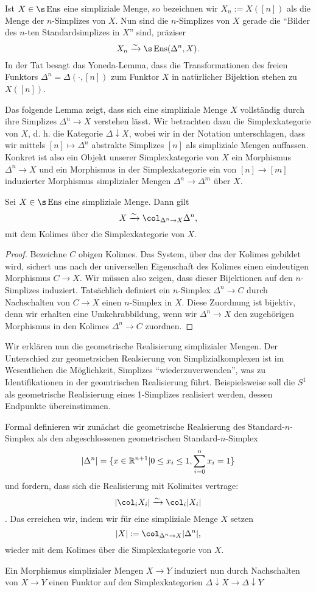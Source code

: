 Ist $X \in \s\Ens$ eine simpliziale Menge, so bezeichnen wir $X_n :=
X([n])$ als die Menge der $n$-Simplizes von $X$. Nun sind die
$n$-Simplizes von $X$ gerade die ``Bilder des $n$-ten
Standardsimplizes in $X$'' sind, präziser
\[ X_n \iso \s\Ens(\Delta^n, X). \]
In der Tat besagt das Yoneda-Lemma, dass die Transformationen des
freien Funktors $\Delta^n = \Delta(\cdot, [n])$ zum Funktor $X$ in
natürlicher Bijektion stehen zu $X([n])$.

Das folgende Lemma zeigt, dass sich eine simpliziale Menge $X$
vollständig durch ihre Simplizes $\Delta^n \to X$ verstehen lässt.
Wir betrachten dazu die Simplexkategorie von $X$, d. h. die Kategorie
$\Delta \downarrow X$, wobei wir in der Notation unterschlagen, dass
wir mittels $[n] \mapsto \Delta^n$ abstrakte Simplizes $[n]$ als
simpliziale Mengen auffassen. Konkret ist also ein Objekt unserer
Simplexkategorie von $X$ ein Morphismus $\Delta^n \to X$ und ein
Morphismus in der Simplexkategorie ein von $[n] \to [m]$ induzierter
Morphismus simplizialer Mengen $\Delta^n \to \Delta^m$ über $X$.

\begin{lemma}
  Sei $X \in \s\Ens$ eine simpliziale Menge. Dann gilt
  \[ X \iso \col_{\Delta^n \to X} \Delta^n, \]
  mit dem Kolimes über die Simplexkategorie von $X$.
\end{lemma}
\begin{proof}
  Bezeichne $C$ obigen Kolimes. Das System, über das der Kolimes
  gebildet wird, sichert uns nach der universellen Eigenschaft des
  Kolimes einen eindeutigen Morphismus $C \to X$. Wir müssen also
  zeigen, dass dieser Bijektionen auf den $n$-Simplizes
  induziert. Tatsächlich definiert ein $n$-Simplex $\Delta^n \to C$
  durch Nachschalten von $C \to X$ einen $n$-Simplex in $X$. Diese
  Zuordnung ist bijektiv, denn wir erhalten eine Umkehrabbildung, wenn
  wir $\Delta^n \to X$ den zugehörigen Morphismus in den Kolimes
  $\Delta^n \to C$ zuordnen.
\end{proof}

Wir erklären nun die geometrische Realisierung simplizialer
Mengen. Der Unterschied zur geometrsichen Realsierung von
Simplizialkomplexen ist im Wesentlichen die Möglichkeit, Simplizes
``wiederzuverwenden'', was zu Identifikationen in der geomtrischen
Realisierung führt. Beispielsweise soll die $S^1$ als geometrische
Realisierung eines 1-Simplizes realisiert werden, dessen Endpunkte
übereinstimmen.

Formal definieren wir zunächst die geometrische Realsierung des
Standard-$n$-Simplex als den abgeschlossenen geometrischen
Standard-$n$-Simplex
\[ |\Delta^n| = \{ x \in \mathbb{R}^{n+1} | 0 \leq x_i \leq 1, \sum_{i=0}^n x_i = 1 \} \]
und fordern, dass sich die Realisierung mit Kolimites vertrage:
\[ |\col_i X_i| \iso \col_i |X_i| \].
Das erreichen wir, indem wir für eine simpliziale Menge $X$ setzen
\[ |X| := \col_{\Delta^n \to X} |\Delta^n|, \]
wieder mit dem Kolimes über die Simplexkategorie von $X$.

Ein Morphismus simplizialer Mengen $X \to Y$ induziert nun durch
Nachschalten von $X \to Y$ einen Funktor auf den Simplexkategorien
$\Delta \downarrow X \to \Delta \downarrow Y$


